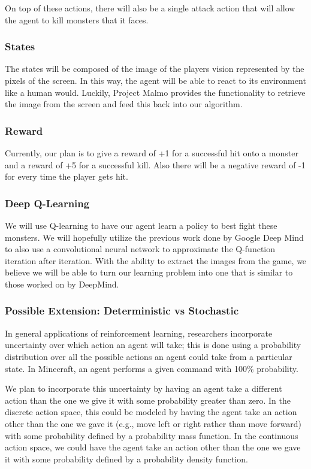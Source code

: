 \documentclass{article}
\begin{document}
On top of these actions, there will also be a single attack action that will allow the agent to kill monsters that it faces. 


\subsubsection{States}

The states will be composed of the image of the players  vision represented by the pixels of the screen. In this way, the agent will be able  to react to its environment like a human would. Luckily, Project Malmo provides the functionality to retrieve the image from the screen and  feed this back into our algorithm.

\subsubsection{ Reward}

Currently,  our plan is to give a reward of +1 for a  successful hit onto a monster and a reward of +5 for a successful kill. Also there will be a negative reward of -1 for every time the player gets hit. 

\subsubsection{Deep Q-Learning}

We will use Q-learning to  have our agent learn a policy to best fight these monsters.  We will hopefully utilize the previous work done by Google Deep Mind to also use a convolutional neural network to approximate the Q-function iteration after iteration.  With the ability to  extract the  images from the game, we believe we will be able to turn our learning problem into one that is similar to those worked on by DeepMind. 

\subsubsection{Possible Extension: Deterministic vs Stochastic}

In general applications of reinforcement learning, researchers incorporate uncertainty over which action an agent will take; this is done using a probability distribution over all the possible actions an agent could take from a particular state. In Minecraft, an agent performs a given command with 100\% probability. 

We plan to incorporate this uncertainty by having an agent take a different action than the one we give it with some probability greater than zero. In the discrete action space, this could be modeled by having the agent take an action other than the one we gave it (e.g., move left or right rather than move forward) with some probability defined by a probability mass function. In the continuous action space, we could have the agent take an action other than the one we gave it with some probability defined by a probability density function. 
\end{document}
